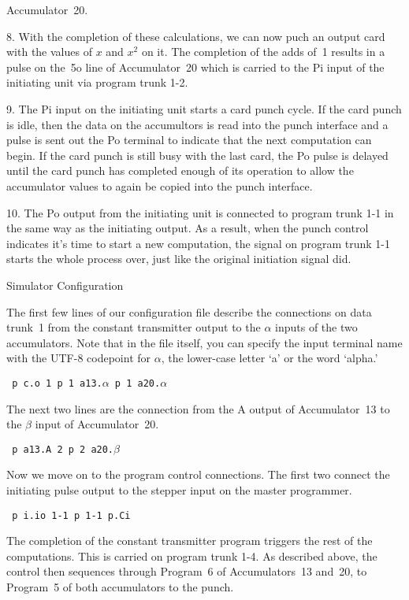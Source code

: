 {Accumulator~20.
\item{8.} With the completion of these calculations, we can now puch an output
card with the values of $x$ and $x^2$ on it.
The completion of the adds of~1 results in a pulse on the~5o line of Accumulator~20
which is carried to the Pi input of the initiating unit via program trunk 1-2.
\item{9.} The Pi input on the initiating unit starts a card punch cycle.
If the card punch is idle, then the data on the accumultors is read into the
punch interface and a pulse is sent out the Po terminal to indicate that the
next computation can begin.
If the card punch is still busy with the last card, the Po pulse is delayed until
the card punch has completed enough of its operation to allow the accumulator
values to again be copied into the punch interface.
\item{10.} The Po output from the initiating unit is connected to program trunk 1-1
in the same way as the initiating output.
As a result, when the punch control indicates it's time to start a new computation,
the signal on program trunk 1-1 starts the whole process over, just like the
original initiation signal did.

}

\beginsection
Simulator Configuration

The first few lines of our configuration file describe the connections
on data trunk~1 from the constant transmitter output to the $\alpha$
inputs of the two accumulators.
Note that in the file itself, you can specify the input terminal name
with the UTF-8 codepoint for $\alpha$, the lower-case letter `a'
or the word `alpha.'

{\obeylines\tt
p c.o 1
p 1 a13.$\alpha$
p 1 a20.$\alpha$

}

\noindent
The next two lines are the connection from the A output of Accumulator~13
to the $\beta$ input of Accumulator~20.

{\obeylines\tt
p a13.A 2
p 2 a20.$\beta$

}

\noindent
Now we move on to the program control connections.
The first two connect the initiating pulse output to the stepper input
on the master programmer.

{\obeylines\tt
p i.io 1-1
p 1-1 p.Ci

}

\noindent
The completion of the constant transmitter program triggers
the rest of the computations.
This is carried on program trunk 1-4.
As described above, the control then sequences through Program~6
of Accumulators~13 and~20, to Program~5 of both accumulators
to the punch.

